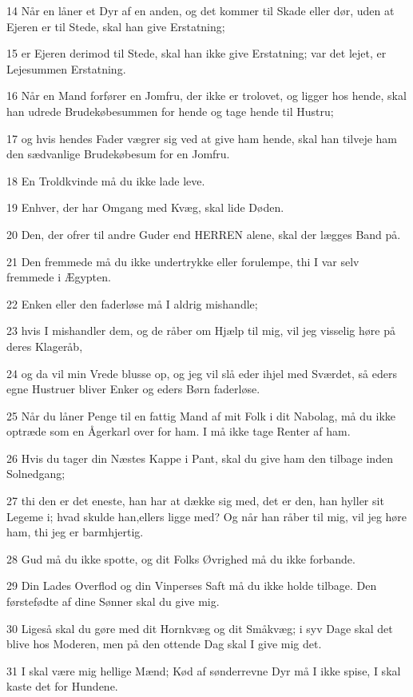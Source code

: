\par 14 Når en låner et Dyr af en anden, og det kommer til Skade eller dør, uden at Ejeren er til Stede, skal han give Erstatning;
\par 15 er Ejeren derimod til Stede, skal han ikke give Erstatning; var det lejet, er Lejesummen Erstatning.
\par 16 Når en Mand forfører en Jomfru, der ikke er trolovet, og ligger hos hende, skal han udrede Brudekøbesummen for hende og tage hende til Hustru;
\par 17 og hvis hendes Fader vægrer sig ved at give ham hende, skal han tilveje ham den sædvanlige Brudekøbesum for en Jomfru.
\par 18 En Troldkvinde må du ikke lade leve.
\par 19 Enhver, der har Omgang med Kvæg, skal lide Døden.
\par 20 Den, der ofrer til andre Guder end HERREN alene, skal der lægges Band på.
\par 21 Den fremmede må du ikke undertrykke eller forulempe, thi I var selv fremmede i Ægypten.
\par 22 Enken eller den faderløse må I aldrig mishandle;
\par 23 hvis I mishandler dem, og de råber om Hjælp til mig, vil jeg visselig høre på deres Klageråb,
\par 24 og da vil min Vrede blusse op, og jeg vil slå eder ihjel med Sværdet, så eders egne Hustruer bliver Enker og eders Børn faderløse.
\par 25 Når du låner Penge til en fattig Mand af mit Folk i dit Nabolag, må du ikke optræde som en Ågerkarl over for ham. I må ikke tage Renter af ham.
\par 26 Hvis du tager din Næstes Kappe i Pant, skal du give ham den tilbage inden Solnedgang;
\par 27 thi den er det eneste, han har at dække sig med, det er den, han hyller sit Legeme i; hvad skulde han,ellers ligge med? Og når han råber til mig, vil jeg høre ham, thi jeg er barmhjertig.
\par 28 Gud må du ikke spotte, og dit Folks Øvrighed må du ikke forbande.
\par 29 Din Lades Overflod og din Vinperses Saft må du ikke holde tilbage. Den førstefødte af dine Sønner skal du give mig.
\par 30 Ligeså skal du gøre med dit Hornkvæg og dit Småkvæg; i syv Dage skal det blive hos Moderen, men på den ottende Dag skal I give mig det.
\par 31 I skal være mig hellige Mænd; Kød af sønderrevne Dyr må I ikke spise, I skal kaste det for Hundene.

